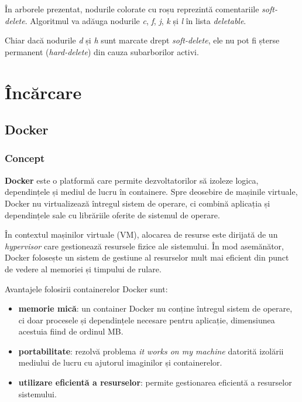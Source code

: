 \vspace{2em}

\par
În arborele prezentat, nodurile colorate cu roșu reprezintă comentariile \textit{soft-delete}. Algoritmul
va adăuga nodurile \textit{c}, \textit{f}, \textit{j}, \textit{k} și \textit{l} în lista \textit{deletable}.
\par
Chiar dacă nodurile \textit{d} și \textit{h} sunt marcate drept \textit{soft-delete}, ele nu pot fi șterse
permanent (\textit{hard-delete}) din cauza subarborilor activi.

\section{Încărcare}
\subsection{Docker}

\subsubsection{Concept}
\textbf{Docker} este o platformă care permite dezvoltatorilor să izoleze logica, dependințele și mediul de lucru
în containere. Spre deosebire de mașinile virtuale, Docker nu virtualizează întregul sistem de operare,
ci combină aplicația și dependințele sale cu librăriile oferite de sistemul de operare.
\par
În contextul mașinilor virtuale (VM), alocarea de resurse este dirijată de un \textit{hypervisor} care
gestionează resursele fizice ale sistemului. În mod asemănător, Docker folosește un sistem de gestiune
al resurselor mult mai eficient din punct de vedere al memoriei și timpului de rulare. 
\par
Avantajele folosirii containerelor Docker sunt:
\begin{itemize}
    \item \textbf{memorie mică}: un container Docker nu conține întregul sistem de operare, ci doar
    procesele și dependințele necesare pentru aplicație, dimensiunea acestuia fiind de ordinul MB.
    \item \textbf{portabilitate}: rezolvă problema \textit{it works on my machine} datorită
    izolării mediului de lucru cu ajutorul imaginilor și containerelor.
    \item \textbf{utilizare eficientă a resurselor}: permite gestionarea eficientă a resurselor sistemului.
\end{itemize}

